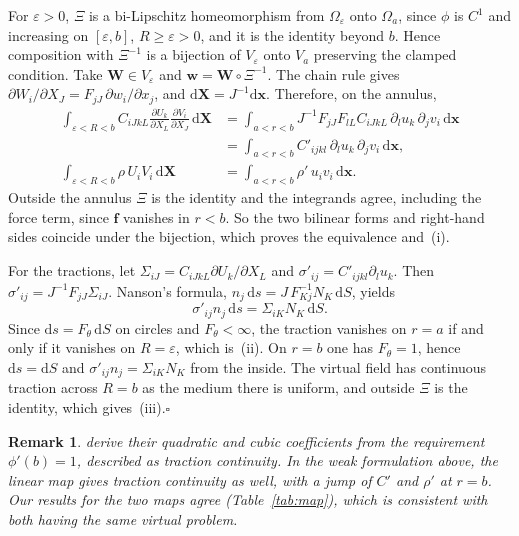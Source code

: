 \documentclass[preprint,12pt]{elsarticle}
\newcommand{\mbf}[1]{\mathbf{#1}}
\newcommand{\be}{\begin{equation}}
\newcommand{\ee}{\end{equation}}
\newcommand{\qedbox}{\hfill$\square$}
\newtheorem{remark}{Remark}
\begin{document}
\begin{pf}
For $\varepsilon>0$, $\Xi$ is a bi-Lipschitz homeomorphism from $\Omega_\varepsilon$ onto $\Omega_a$, since $\phi$
is $C^1$ and increasing on $[\varepsilon,b]$, $R\ge\varepsilon>0$, and it is the identity beyond $b$. Hence composition
with $\Xi^{-1}$ is a bijection of $V_\varepsilon$ onto $V_a$ preserving the clamped condition. Take $\mbf{W}\in V_\varepsilon$ and
$\mbf{w}=\mbf{W}\circ\Xi^{-1}$. The chain rule gives $\partial W_i/\partial X_J=F_{jJ}\,\partial w_i/\partial x_j$, and
$\mathrm{d}\mbf{X}=J^{-1}\mathrm{d}\mbf{x}$. Therefore, on the annulus,
\begin{align*}
\int_{\varepsilon<R<b}\! C_{iJkL}\frac{\partial U_k}{\partial X_L}\frac{\partial V_i}{\partial X_J}\,\mathrm{d}\mbf{X}
&=\int_{a<r<b}\! J^{-1}F_{jJ}F_{lL}C_{iJkL}\,\partial_l u_k\,\partial_j v_i\,\mathrm{d}\mbf{x}\\
&=\int_{a<r<b}\! C'_{ijkl}\,\partial_l u_k\,\partial_j v_i\,\mathrm{d}\mbf{x},\\
\int_{\varepsilon<R<b}\!\rho\,U_iV_i\,\mathrm{d}\mbf{X}&=\int_{a<r<b}\!\rho'\,u_iv_i\,\mathrm{d}\mbf{x}.
\end{align*}
Outside the annulus $\Xi$ is the identity and the integrands agree, including the force term, since $\mbf{f}$
vanishes in $r<b$. So the two bilinear forms and right-hand sides coincide under the bijection, which proves the
equivalence and~(i).

For the tractions, let $\Sigma_{iJ}=C_{iJkL}\partial U_k/\partial X_L$ and $\sigma'_{ij}=C'_{ijkl}\partial_lu_k$. Then
$\sigma'_{ij}=J^{-1}F_{jJ}\Sigma_{iJ}$. Nanson's formula, $n_j\,\mathrm{d}s=J\,F^{-1}_{Kj}N_K\,\mathrm{d}S$, yields
\be\label{eq:traction}
\sigma'_{ij}n_j\,\mathrm{d}s=\Sigma_{iK}N_K\,\mathrm{d}S .
\ee
Since $\mathrm{d}s=F_\theta\,\mathrm{d}S$ on circles and $F_\theta<\infty$, the traction vanishes on $r=a$ if and only if it
vanishes on $R=\varepsilon$, which is~(ii). On $r=b$ one has $F_\theta=1$, hence $\mathrm{d}s=\mathrm{d}S$
and $\sigma'_{ij}n_j=\Sigma_{iK}N_K$ from the inside. The virtual field has continuous traction across $R=b$
as the medium there is uniform, and outside $\Xi$ is the identity, which gives~(iii).\qedbox
\end{pf}

\begin{remark}
\citet{chatzopoulos2023} derive their quadratic and cubic coefficients from the requirement
$\phi'(b)=1$, described as traction continuity. In the weak formulation above, the linear map gives traction
continuity as well, with a jump of $C'$ and $\rho'$ at $r=b$. Our results for the two maps agree
(Table~\ref{tab:map}), which is consistent with both having the same virtual problem.
\end{remark}
\end{document}
